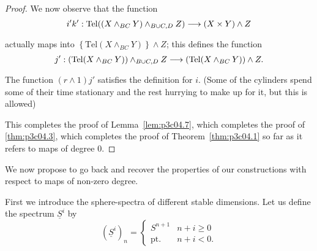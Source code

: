 \documentclass[../main]{subfiles}
\begin{document}
\begin{proof}
We now observe that the function \[i'k' : \mathrm{Tel}((X \wedge_{BC} Y) \wedge_{B \cup C, D} Z) \lar{} (X \times Y) \wedge Z\] actually maps into $\left\{\mathrm{Tel}(X \wedge_{BC} Y)\right\} \wedge Z$; this defines the function \[j' : (\mathrm{Tel}(X \wedge_{BC} Y)) \wedge_{B \cup C, D} Z \lar{} (\mathrm{Tel}(X \wedge_{BC} Y)) \wedge Z.\] The function $(r \wedge 1) j'$ satisfies the definition for $i$. (Some of the cylinders spend some of their time stationary and the rest hurrying to make up for it, but this is allowed) 

This completes the proof of Lemma~\ref{lem:p3c04.7}, which completes the proof of \ref{thm:p3c04.3}, which completes the proof of Theorem~\ref{thm:p3c04.1} so far as it refers to maps of degree $0$. 
\end{proof}

We now propose to go back and recover the properties of our constructions with respect to maps of non-zero degree.

First we introduce the sphere-spectra of different stable dimensions. Let us define the spectrum $\underline S^i$ by \[(\underline S^i)_n = \begin{cases}S^{n + 1} & n + i \ge 0 \\ \mathrm{pt.} & n + i < 0.\end{cases}\]
\end{document}
